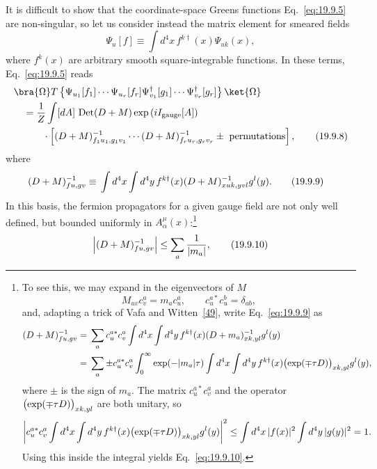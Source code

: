 It is difficult to show that the coordinate-space Greens functions Eq.~\eqref{eq:19.9.5} are non-singular, so let us consider instead the matrix element for smeared fields
\begin{equation}
\Psi_u[f]\equiv\int d^4x\,f^{k\dagger}(x)\Psi_{uk}(x),
\tag{19.9.7}\label{eq:19.9.7}
\end{equation}
where $f^k(x)$ are arbitrary smooth square-integrable functions. In these terms, Eq.~\eqref{eq:19.9.5} reads
\begin{align}
&\bra{\Omega}T\left\{
\Psi_{u_1}[f_1]\cdots\Psi_{u_r}[f_r]
\Psi^\dagger_{v_1}[g_1]\cdots\Psi^\dagger_{v_r}[g_r]
\right\}\ket{\Omega}
\notag\\
&\quad=\frac{1}{Z}\int[dA]\,
\operatorname{Det}(\sl{D}+M)
\exp\left(iI_{\mathrm{gauge}}[A]\right)
\notag\\
&\qquad\quad{}\cdot
\left[
(\sl{D}+M)^{-1}_{f_1u_1,g_1v_1}
\cdots
(\sl{D}+M)^{-1}_{f_ru_r,g_rv_r}
\mathbin{\pm}\text{ permutations}
\right],
\tag{19.9.8}\label{eq:19.9.8}
\end{align}
where
\begin{align}
(\sl{D}+M)^{-1}_{fu,gv}
\equiv{}&
\int d^4x\int d^4y\,
f^{k\dagger}(x)
(\sl{D}+M)^{-1}_{xuk,yvl}
g^l(y).
\tag{19.9.9}\label{eq:19.9.9}
\end{align}
In this basis, the fermion propagators for a given gauge field are not only well defined, but bounded uniformly in $A^\mu_\alpha(x)$:\footnote{To see this, we may expand in the eigenvectors of $M$
\[
M_{uv}c_v^a=m_ac_u^a,
\qquad
c_u^{a*}c_u^b=\delta_{ab},
\]
and, adapting a trick of Vafa and Witten~\hyperref[ch19-ref-49]{[49]}, write Eq.~\eqref{eq:19.9.9} as
\begin{align*}
(\sl{D}+M)^{-1}_{fu,gv}
={}&\sum_a c_u^{a*}c_v^a
\int d^4x\int d^4y\,
f^{k\dagger}(x)
(\sl{D}+m_a)^{-1}_{xk,yl}g^l(y)
\\
={}&\sum_a\mathbin{\pm}c_u^{a*}c_v^a
\int_0^\infty\exp(-|m_a|\tau)
\int d^4x\int d^4y\,
f^{k\dagger}(x)
\bigl(\exp(\mp\tau\sl{D})\bigr)_{xk,yl}
g^l(y),
\end{align*}
where $\pm$ is the sign of $m_a$. The matrix $c_u^{a*}c_v^a$ and the operator $\bigl(\exp(\mp\tau\sl{D})\bigr)_{xk,yl}$ are both unitary, so
\[
\left|
c_u^{a*}c_v^a
\int d^4x\int d^4y\,
f^{k\dagger}(x)
\bigl(\exp(\mp\tau\sl{D})\bigr)_{xk,yl}
g^l(y)
\right|^2
\leq
\int d^4x\,|f(x)|^2
\int d^4y\,|g(y)|^2
=1.
\]
Using this inside the integral yields Eq.~\eqref{eq:19.9.10}.}
\begin{equation}
\left|(\sl{D}+M)^{-1}_{fu,gv}\right|
\leq\sum_a\frac{1}{|m_a|},
\tag{19.9.10}\label{eq:19.9.10}
\end{equation}
